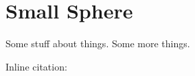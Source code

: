 \chapter{Small Sphere}
\label{SmallSphereChapter}

Some stuff about things.\cite{example-citation} Some more things. 

Inline citation: 

\blindtext
